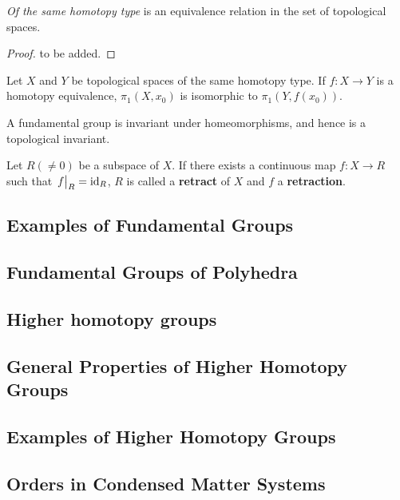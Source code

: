 \documentclass[10pt]{article}
\begin{document}
\begin{proposition}
    \textit{Of the same homotopy type} is an equivalence relation in the set of topological spaces.
\end{proposition}
\begin{proof}
    to be added.
\end{proof}

\begin{theorem}
    Let $X$ and $Y$ be topological spaces of the same homotopy type.
    If $f:X\to Y$ is a homotopy equivalence, $\pi_1(X,x_0)$ is isomorphic to $\pi_1(Y,f(x_0))$.
\end{theorem}

\begin{corollary}
    A fundamental group is invariant under homeomorphisms, and hence is a topological invariant.
\end{corollary}

\begin{definition}
    Let $R(\neq0)$ be a subspace of $X$.
    If there exists a continuous map $f:X\to R$ such that $\eval{f}_{R}=\text{id}_R$, $R$ is called a \textbf{retract} of $X$ and $f$ a \textbf{retraction}.
\end{definition}

\subsection{Examples of Fundamental Groups}
\subsection{Fundamental Groups of Polyhedra}
\subsection{Higher homotopy groups}
\subsection{General Properties of Higher Homotopy Groups}
\subsection{Examples of Higher Homotopy Groups}
\subsection{Orders in Condensed Matter Systems}
\end{document}
